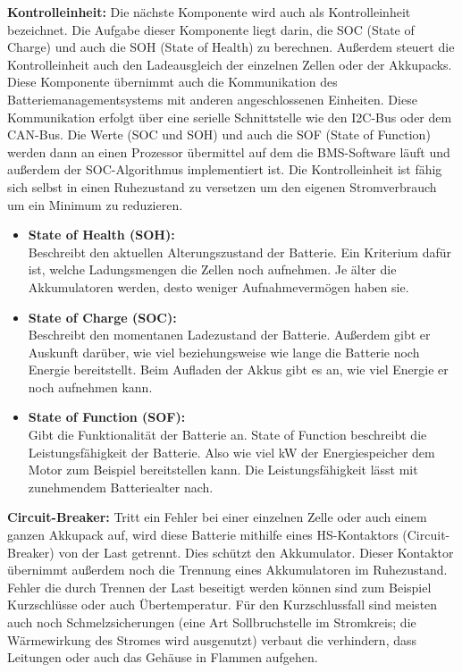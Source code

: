 \textbf{Kontrolleinheit:}
Die nächste Komponente wird auch als Kontrolleinheit bezeichnet. Die Aufgabe dieser Komponente liegt darin, die SOC (State of Charge) und auch die SOH (State of Health) zu berechnen. Außerdem steuert die Kontrolleinheit auch den Ladeausgleich der einzelnen Zellen oder der Akkupacks. Diese Komponente übernimmt auch die Kommunikation des Batteriemanagementsystems mit anderen angeschlossenen Einheiten. Diese Kommunikation erfolgt über eine serielle Schnittstelle wie den I2C-Bus oder dem CAN-Bus. Die Werte (SOC und SOH) und auch die SOF (State of Function) werden dann an einen Prozessor übermittel auf dem die BMS-Software läuft und außerdem der SOC-Algorithmus implementiert ist. Die Kontrolleinheit ist fähig sich selbst in einen Ruhezustand zu versetzen um den eigenen Stromverbrauch um ein Minimum zu reduzieren.

\begin{itemize}
	\item \textbf{State of Health (SOH):} \medskip\\
	Beschreibt den aktuellen Alterungszustand der Batterie. Ein Kriterium dafür ist, welche Ladungsmengen die Zellen noch aufnehmen. Je älter die Akkumulatoren werden, desto weniger Aufnahmevermögen haben sie.

\item \textbf{State of Charge (SOC):} \medskip\\
	Beschreibt den momentanen Ladezustand der Batterie. Außerdem gibt er Auskunft darüber, wie viel beziehungsweise wie lange die Batterie noch Energie bereitstellt. Beim Aufladen der Akkus gibt es an, wie viel Energie er noch aufnehmen kann.

\item \textbf{State of Function (SOF):} \medskip\\
	Gibt die Funktionalität der Batterie an. State of Function beschreibt die Leistungsfähigkeit der Batterie. Also wie viel kW der Energiespeicher dem Motor zum Beispiel bereitstellen kann. Die Leistungsfähigkeit lässt mit zunehmendem Batteriealter nach.
\end{itemize}

\textbf{Circuit-Breaker:}
Tritt ein Fehler bei einer einzelnen Zelle oder auch einem ganzen Akkupack auf, wird diese Batterie mithilfe eines HS-Kontaktors (Circuit-Breaker) von der Last getrennt. Dies schützt den Akkumulator. Dieser Kontaktor übernimmt außerdem noch die Trennung eines Akkumulatoren im Ruhezustand. Fehler die durch Trennen der Last beseitigt werden können sind zum Beispiel Kurzschlüsse oder auch Übertemperatur. Für den Kurzschlussfall sind meisten auch noch Schmelzsicherungen (eine Art Sollbruchstelle im Stromkreis; die Wärmewirkung des Stromes wird ausgenutzt) verbaut die verhindern, dass Leitungen oder auch das Gehäuse in Flammen aufgehen.

